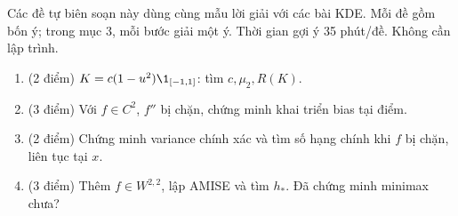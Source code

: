 \clearpage
{}
\noindent Các đề tự biên soạn này dùng cùng mẫu lời giải với các bài KDE. Mỗi đề gồm bốn ý; trong mục 3, mỗi bước giải một ý. Thời gian gợi ý 35 phút/đề. Không cần lập trình.

\begin{problem}
\begin{enumerate}
\item (2 điểm) $K=c(1-u^2)\1_{[-1,1]}$: tìm $c,\mu_2,R(K)$.
\item (3 điểm) Với $f\in C^2$, $f''$ bị chặn, chứng minh khai triển bias tại điểm.
\item (2 điểm) Chứng minh variance chính xác và tìm số hạng chính khi $f$ bị chặn, liên tục tại $x$.
\item (3 điểm) Thêm $f\in W^{2,2}$, lập AMISE và tìm $h_*$. Đã chứng minh minimax chưa?
\end{enumerate}
\end{problem}
